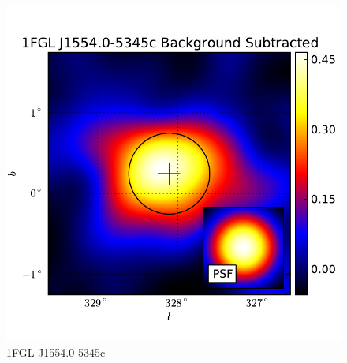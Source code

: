 \documentclass[preprint]{aastex}
\begin{document}
  \begin{figure}
    \begin{center}
      \includegraphics[type=pdf,ext=.pdf,read=.pdf]{source_plots/source_1FGL_J1554.0-5345c}
    \end{center}
    \caption{1FGL J1554.0-5345c}
  \end{figure}
\end{document}
